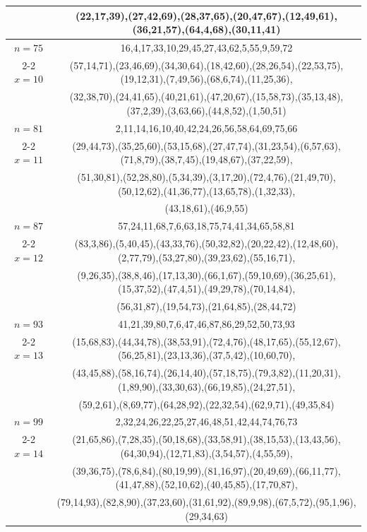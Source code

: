 \begin{tabular}{| c | c |}
&(22,17,39),(27,42,69),(28,37,65),(20,47,67),(12,49,61),(36,21,57),(64,4,68),(30,11,41)\\
\hline 
\(n=75\) & 
16,4,17,33,10,29,45,27,43,62,5,55,9,59,72\\
\cline{2-2}
\(x=10\)
&(57,14,71),(23,46,69),(34,30,64),(18,42,60),(28,26,54),(22,53,75),(19,12,31),(7,49,56),(68,6,74),(11,25,36),\\
&(32,38,70),(24,41,65),(40,21,61),(47,20,67),(15,58,73),(35,13,48),(37,2,39),(3,63,66),(44,8,52),(1,50,51)\\
\hline 
\(n=81\) & 
2,11,14,16,10,40,42,24,26,56,58,64,69,75,66\\
\cline{2-2}
\(x=11\)
&(29,44,73),(35,25,60),(53,15,68),(27,47,74),(31,23,54),(6,57,63),(71,8,79),(38,7,45),(19,48,67),(37,22,59),\\
&(51,30,81),(52,28,80),(5,34,39),(3,17,20),(72,4,76),(21,49,70),(50,12,62),(41,36,77),(13,65,78),(1,32,33),\\
&(43,18,61),(46,9,55)\\
\hline 
\(n=87\) & 
57,24,11,68,7,6,63,18,75,74,41,34,65,58,81\\
\cline{2-2}
\(x=12\)
&(83,3,86),(5,40,45),(43,33,76),(50,32,82),(20,22,42),(12,48,60),(2,77,79),(53,27,80),(39,23,62),(55,16,71),\\
&(9,26,35),(38,8,46),(17,13,30),(66,1,67),(59,10,69),(36,25,61),(15,37,52),(47,4,51),(49,29,78),(70,14,84),\\
&(56,31,87),(19,54,73),(21,64,85),(28,44,72)\\
\hline 
\(n=93\) & 
41,21,39,80,7,6,47,46,87,86,29,52,50,73,93\\
\cline{2-2}
\(x=13\)
&(15,68,83),(44,34,78),(38,53,91),(72,4,76),(48,17,65),(55,12,67),(56,25,81),(23,13,36),(37,5,42),(10,60,70),\\
&(43,45,88),(58,16,74),(26,14,40),(57,18,75),(79,3,82),(11,20,31),(1,89,90),(33,30,63),(66,19,85),(24,27,51),\\
&(59,2,61),(8,69,77),(64,28,92),(22,32,54),(62,9,71),(49,35,84)\\
\hline 
\(n=99\) & 
2,32,24,26,22,25,27,46,48,51,42,44,74,76,73\\
\cline{2-2}
\(x=14\)
&(21,65,86),(7,28,35),(50,18,68),(33,58,91),(38,15,53),(13,43,56),(64,30,94),(12,71,83),(3,54,57),(4,55,59),\\
&(39,36,75),(78,6,84),(80,19,99),(81,16,97),(20,49,69),(66,11,77),(41,47,88),(52,10,62),(40,45,85),(17,70,87),\\
&(79,14,93),(82,8,90),(37,23,60),(31,61,92),(89,9,98),(67,5,72),(95,1,96),(29,34,63)\\

\end{tabular}
